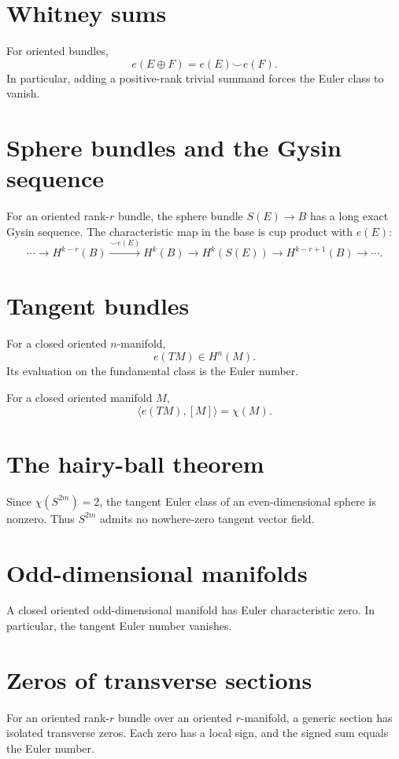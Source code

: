 \section{Whitney sums}
For oriented bundles,
\[
e(E\oplus F)=e(E)\smile e(F).
\]
In particular, adding a positive-rank trivial summand forces the Euler class to
vanish.

\section{Sphere bundles and the Gysin sequence}
For an oriented rank-$r$ bundle, the sphere bundle $S(E)\to B$ has a long exact
Gysin sequence.  The characteristic map in the base is cup product with
$e(E)$:
\[
\cdots\to H^{k-r}(B)\xrightarrow{\smile e(E)}H^k(B)
\to H^k(S(E))\to H^{k-r+1}(B)\to\cdots.
\]

\section{Tangent bundles}
For a closed oriented $n$-manifold,
\[
e(TM)\in H^n(M).
\]
Its evaluation on the fundamental class is the Euler number.

\begin{theorem}
\label{thm:viii32-euler-characteristic}
For a closed oriented manifold $M$,
\[
\langle e(TM),[M]\rangle=\chi(M).
\]
\end{theorem}

\section{The hairy-ball theorem}
Since $\chi(S^{2m})=2$, the tangent Euler class of an even-dimensional sphere
is nonzero.  Thus $S^{2m}$ admits no nowhere-zero tangent vector field.

\section{Odd-dimensional manifolds}
A closed oriented odd-dimensional manifold has Euler characteristic zero.  In
particular, the tangent Euler number vanishes.

\section{Zeros of transverse sections}
For an oriented rank-$r$ bundle over an oriented $r$-manifold, a generic
section has isolated transverse zeros.  Each zero has a local sign, and the
signed sum equals the Euler number.

